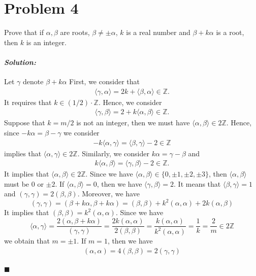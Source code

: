 \documentclass[12pt, a4paper]{article}
\newenvironment{solution}
  {\paragraph{\textit{Solution:}}\par\medskip}
  {\hfill$\blacksquare$\vspace{0.1cm}}
\begin{document}
\section*{Problem 4}
Prove that if $\alpha, \beta$ are roots, $\beta \neq \pm \alpha$, $k$ is a real number and $\beta + k \alpha$ is a root, then $k$ is an integer.
\begin{solution}
  Let $\gamma$ denote $\beta+k\alpha$
  First, we consider that 
  \begin{align*}
    \langle \gamma,\alpha \rangle = 2k+\langle \beta,\alpha\rangle  \in \mathbb{Z}.
  \end{align*}
  It requires that $k\in (1/2)\cdot \mathbb{Z}$. Hence, we consider 
  \begin{align*}
    \langle \gamma,\beta \rangle = 2 + k\langle \alpha,\beta\rangle \in \mathbb{Z}.
  \end{align*}
  Suppose that $k=m/2$ is not an integer, then we must have $\langle \alpha,\beta\rangle \in 2\mathbb{Z}$.
  Hence, since $-k\alpha = \beta - \gamma$ we consider
  \begin{align*}
    -k \langle \alpha, \gamma \rangle = \langle \beta, \gamma \rangle - 2 \in \mathbb{Z}
  \end{align*}
  implies that $\langle\alpha,\gamma\rangle \in 2\mathbb{Z}$. Similarly, we consider $k\alpha = \gamma - \beta$  and 
  \begin{align*}
    k\langle \alpha, \beta \rangle  = \langle \gamma, \beta \rangle - 2 \in \mathbb{Z}.
  \end{align*}
  It implies that $\langle \alpha, \beta \rangle\in 2\mathbb{Z}$. Since we have $\langle \alpha, \beta \rangle\in\{0, \pm 1, \pm 2, \pm 3\}$, then $\langle \alpha, \beta \rangle$ must be $0$ or $\pm 2$.
  If $\langle \alpha, \beta \rangle = 0$, then we have $\langle \gamma,\beta\rangle = 2$.
  It means that $\langle \beta,\gamma\rangle = 1$ and $(\gamma, \gamma) = 2(\beta, \beta)$. Moreover, we have 
  $$(\gamma, \gamma) = (\beta + k\alpha, \beta + k\alpha) = (\beta, \beta) + k^2(\alpha, \alpha) + 2k(\alpha, \beta)$$
  It implies that $(\beta, \beta) = k^2(\alpha, \alpha)$.
  Since we have
  $$\langle \alpha, \gamma \rangle = \frac{2(\alpha, \beta + k\alpha)}{(\gamma, \gamma)} = \frac{2k(\alpha, \alpha)}{2(\beta, \beta)} = \frac{k(\alpha, \alpha)}{k^2(\alpha, \alpha)} = \frac{1}{k} = \frac{2}{m}\in 2\mathbb{Z}$$
  we obtain that $m=\pm 1$. If $m=1$, then we have 
  \begin{align*}
    (\alpha, \alpha) = 4(\beta, \beta) = 2(\gamma, \gamma)
  \end{align*}

\end{solution}
\end{document}
